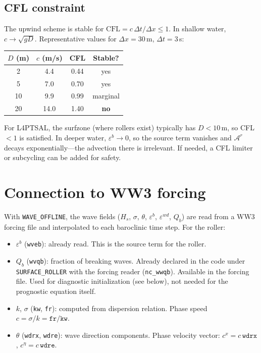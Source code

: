 \documentclass[11pt]{article}
\begin{document}
\subsection*{CFL constraint}

The upwind scheme is stable for $\mathrm{CFL} = c\,\Delta t/\Delta x \leq 1$.
In shallow water, $c \to \sqrt{gD}$. Representative values for
$\Delta x = 30$\,m, $\Delta t = 3$\,s:

\medskip
\begin{center}
\begin{tabular}{@{}cccc@{}}
\toprule
$D$ (m) & $c$ (m/s) & CFL & Stable? \\
\midrule
2  & 4.4  & 0.44 & yes \\
5  & 7.0  & 0.70 & yes \\
10 & 9.9  & 0.99 & marginal \\
20 & 14.0 & 1.40 & \textbf{no} \\
\bottomrule
\end{tabular}
\end{center}

\medskip\noindent
For L4PTSAL, the surfzone (where rollers exist) typically has $D < 10$\,m,
so CFL $< 1$ is satisfied. In deeper water, $\varepsilon^b \to 0$, so
the source term vanishes and $\mathscr{A}^r$ decays exponentially---the
advection there is irrelevant. If needed, a CFL limiter or subcycling can
be added for safety.

\section{Connection to WW3 forcing}

With \texttt{WAVE\_OFFLINE}, the wave fields ($H_s$, $\sigma$, $\theta$,
$\varepsilon^b$, $\varepsilon^{wd}$, $Q_b$) are read from a WW3 forcing
file and interpolated to each baroclinic time step. For the roller:

\begin{itemize}
\item $\varepsilon^b$ (\texttt{wveb}): already read. This is the source
  term for the roller.
\item $Q_b$ (\texttt{wvqb}): fraction of breaking waves. Already declared
  in the code under \texttt{SURFACE\_ROLLER} with the forcing reader
  (\texttt{nc\_wwqb}). Available in the forcing file.
  Used for diagnostic initialization (see below), not needed for the
  prognostic equation itself.
\item $k$, $\sigma$ (\texttt{kw}, \texttt{fr}): computed from dispersion
  relation. Phase speed $c = \sigma/k = \texttt{fr/kw}$.
\item $\theta$ (\texttt{wdrx}, \texttt{wdre}): wave direction components.
  Phase velocity vector: $c^x = c\,\texttt{wdrx}$,
  $c^\eta = c\,\texttt{wdre}$.
\end{itemize}
\end{document}
